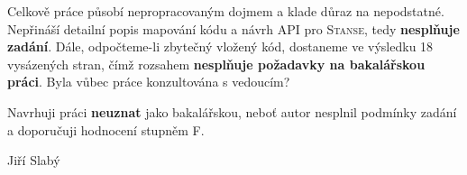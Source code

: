 \documentclass{article}
\begin{document}
Celkově práce působí nepropracovaným dojmem a klade důraz na nepodstatné.
Nepřináší detailní popis mapování kódu a návrh API pro \textsc{Stanse}, tedy
\textbf{nesplňuje zadání}. Dále, odpočteme-li zbytečný vložený kód, dostaneme
ve výsledku 18 vysázených stran, čímž rozsahem \textbf{nesplňuje požadavky na
bakalářskou práci}. Byla vůbec práce konzultována s vedoucím?

Navrhuji práci \textbf{neuznat} jako bakalářskou, neboť autor
nesplnil podmínky zadání a doporučuji hodnocení stupněm F.

\begin{flushright}
Jiří Slabý
\end{flushright}
\end{document}
